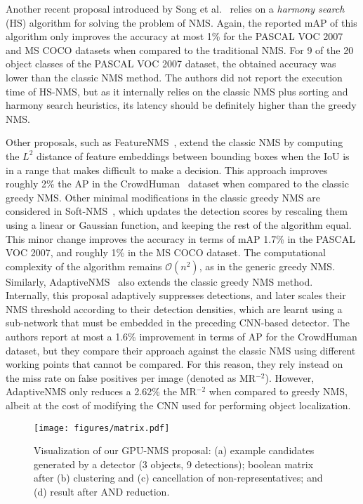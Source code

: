 Another recent proposal introduced by Song et al.~\cite{song2019improved} relies on a \emph{harmony search} (HS) algorithm for solving the problem of NMS. Again, the reported 
mAP of this algorithm only improves the accuracy at most 1\% for the PASCAL VOC 2007 and MS COCO datasets when compared to the traditional NMS. For 9 of the 20 object classes of 
the PASCAL VOC 2007 dataset, the obtained accuracy was lower than the classic NMS method. The authors did not report the execution time of HS-NMS, but as it internally relies 
on the classic NMS plus sorting and harmony search heuristics, its latency should be definitely higher than the greedy NMS.

Other proposals, such as FeatureNMS~\cite{salscheider2020featurenms}, extend the classic NMS by computing the $L^{2}$ distance of feature embeddings between bounding boxes 
when the IoU is in a range that makes difficult to make a decision. This approach improves roughly 2\% the AP in the CrowdHuman~\cite{shao2018crowdhuman} dataset when compared 
to the classic greedy NMS. Other minimal modifications in the classic greedy NMS are considered in Soft-NMS~\cite{bodla2017soft}, which updates the detection scores by rescaling 
them using a linear or Gaussian function, and keeping the rest of the algorithm equal. This minor change improves the accuracy in terms of mAP 1.7\% in the PASCAL VOC 2007, and 
roughly 1\% in the MS COCO dataset. The computational complexity of the algorithm remains $\mathcal{O}(n^{2})$, as in the generic greedy NMS. Similarly, AdaptiveNMS~\cite{liu2019adaptive} 
also extends the classic greedy NMS method. Internally, this proposal adaptively suppresses detections, and later scales their NMS threshold according to their detection densities, 
which are learnt using a sub-network that must be embedded in the preceding CNN-based detector. The authors report at most a 1.6\% improvement in terms of AP for the CrowdHuman 
dataset, but they compare their approach against the classic NMS using different working points that cannot be compared. For this reason, they rely instead on the miss rate on 
false positives per image (denoted as MR$^{-2}$). However, AdaptiveNMS only reduces a 2.62\% the MR$^{-2}$ when compared to greedy NMS, albeit at the cost of modifying the CNN 
used for performing object localization.

\begin{figure}[t]
\centering
\texttt{[image: figures/matrix.pdf]}
\caption{\label{fig:mapkernel} Visualization of our GPU-NMS proposal: 
(a) example candidates generated by a detector (3 objects, 9 detections); 
boolean matrix after (b) clustering and (c) cancellation of 
non-representatives; and (d) result after AND reduction.}
\end{figure}

